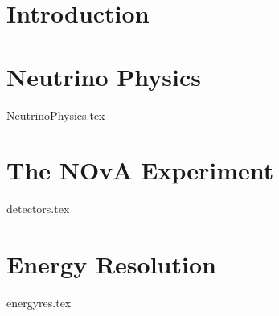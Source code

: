 \documentclass[a4paper,11pt]{report}
\newcommand{\linespacing}{1.5}
\renewcommand{\baselinestretch}{\linespacing}
\begin{document}

%
%
%

%
%
%
%
%
\newpage
{}



\chapter{Introduction}



\chapter{Neutrino Physics}
{NeutrinoPhysics.tex}
\chapter{The NOvA Experiment}
{detectors.tex}

\chapter{Energy Resolution}
{energyres.tex}


\clearpage
{}
%

 

\end{document}
